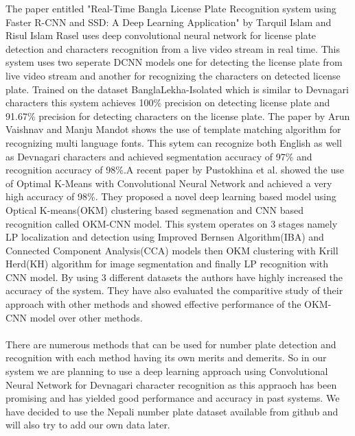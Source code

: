 The paper entitled "Real-Time Bangla License Plate Recognition system using Faster R-CNN and SSD: A Deep Learning Application" \cite{islam2019real} by Tarquil Islam and Risul Islam Rasel uses deep convolutional neural network for license plate detection and characters recognition from a live video stream in real time. This system uses two seperate DCNN models one for detecting the license plate from live video stream and another for recognizing the characters on detected license plate. Trained on the dataset BanglaLekha-Isolated which is similar to Devnagari characters this system achieves 100\% precision on detecting license plate and 91.67\%  precision for detecting characters on the license plate. The paper by Arun Vaishnav and Manju Mandot \cite{vaishnav2018integrated} shows the use of template matching algorithm for recognizing multi language fonts. This sytem can recognize both English as well as Devnagari characters and achieved segmentation accuracy of 97\% and recognition accuracy of 98\%.A recent paper by Pustokhina et al. \cite{pustokhina2020automatic} showed the use of Optimal K-Means with Convolutional Neural Network and achieved a very high accuracy of 98\%. They proposed a novel deep learning based model using Optical K-means(OKM) clustering based segmenation and CNN based recognition called OKM-CNN model. This system operates on 3 stages namely LP localization and detection using Improved Bernsen Algorithm(IBA) and Connected Component Analysis(CCA) models then OKM clustering with Krill Herd(KH) algorithm for image segmentation and finally LP recognition with CNN model. By using 3 different datasets the authors have highly increased the accuracy of the system. They have also evaluated the comparitive study of their approach with other methods and showed effective performance of the OKM-CNN model over other methods.
\\\\
There are numerous methods that can be used for number plate detection and recognition with each method having its own merits and demerits. So in our system we are planning to use a deep learning approach using Convolutional Neural Network for Devnagari character recognition as this appraoch has been promising and has yielded good performance and accuracy in past systems. We have decided to use the Nepali number plate dataset available from github\cite{anpr_dataset_github} and will also try to add our own data later. 